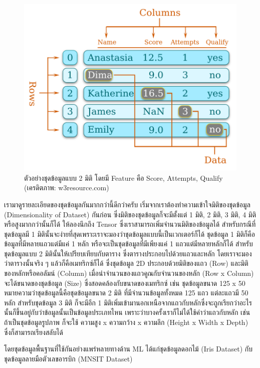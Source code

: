 
\begin{figure}[htbp]
    \centering
    \includegraphics[width=0.7\linewidth]{fig/dataset.png}
    \caption{ตัวอย่างชุดข้อมูลแบบ 2 มิติ โดยมี Feature คือ Score, Attempts, Qualify (เครดิตภาพ: w3resource.com)}
    \label{fig:dataset}
\end{figure}

เรามาดูรายละเอียดของชุดข้อมูลกันมากกว่านี้ดีกว่าครับ เริ่มจากเราต้องทำความเข้าใจมิติของชุดข้อมูล (Dimensionality of Dataset) กันก่อน
ซึ่งมิติของชุดข้อมูลก็จะมีตั้งแต่ 1 มิติ, 2 มิติ, 3 มิติ, 4 มิติ หรือสูงมากกว่านั้นก็ได้ ให้ลองนึกถึง Tensor ซึ่งเราสามารถเพิ่มจำนวนมิติของข้อมูลได้
สำหรับกรณีที่ชุดข้อมูลมี 1 มิตินั้นจะง่ายที่สุดเพราะเราจะมองว่าชุดข้อมูลแบบนี้เป็นเวกเตอร์ก็ได้ ชุดข้อมูล 1 มิติก็คือข้อมูลที่มีหลายแถวแต่มีแค่ 1 หลัก 
หรือจะเป็นชุดข้อมูลที่มีเพียงแค่ 1 แถวแต่มีหลายหลักก็ได้ สำหรับชุดข้อมูลแบบ 2 มิตินั้นให้เปรียบเทียบกับตาราง ซึ่งตารางประกอบไปด้วยแถวและหลัก
โดยเราจะมองว่าตารางนั้นจริง ๆ แล้วก็คือเมทริกซ์ก็ได้ ซึ่งชุดข้อมูล 2D ประกอบด้วยมิติของแถว (Row) และมิติของหลักหรือคอลัมน์ (Column) 
เมื่อนำจำนวนของแถวคูณกับจำนวนของหลัก (Row x Column) จะได้ขนาดของชุดข้อมูล (Size) ซึ่งสอดคล้องกับขนาดของเมทริกซ์ เช่น 
ชุดข้อมูลขนาด 125 x 50 หมายความว่าชุดข้อมูลนี้คือชุดข้อมูลขนาด 2 มิติ ที่มีจำนวนข้อมูลทั้งหมด 125 แถว แต่ละแถวมี 50 หลัก 
สำหรับชุดข้อมูล 3 มิติ ก็จะมีอีก 1 มิติเพิ่มเข้ามานอกเหนือจากแถวกับหลักซึ่งจะถูกเรียกว่าอะไรนั้นก็ขึ้นอยู่กับว่าข้อมูลนั้นเป็นข้อมูลประเภทไหน 
เพราะว่าบางครั้งเราก็ไม่ได้ใช้คำว่าแถวกับหลัก เช่น ถ้าเป็นชุดข้อมูลรูปภาพ ก็จะใช้ ความสูง x ความกว้าง x ความลึก (Height x Width x Depth) 
ซึ่งก็สามารถเรียงสลับได้

โดยชุดข้อมูลพื้นฐานที่ใช้กันอย่างแพร่หลายทางด้าน ML ได้แก่ชุดข้อมูลดอกไม้ (Iris Dataset) กับชุดข้อมูลลายมือตัวเลขอารบิก (MNSIT 
Dataset)

